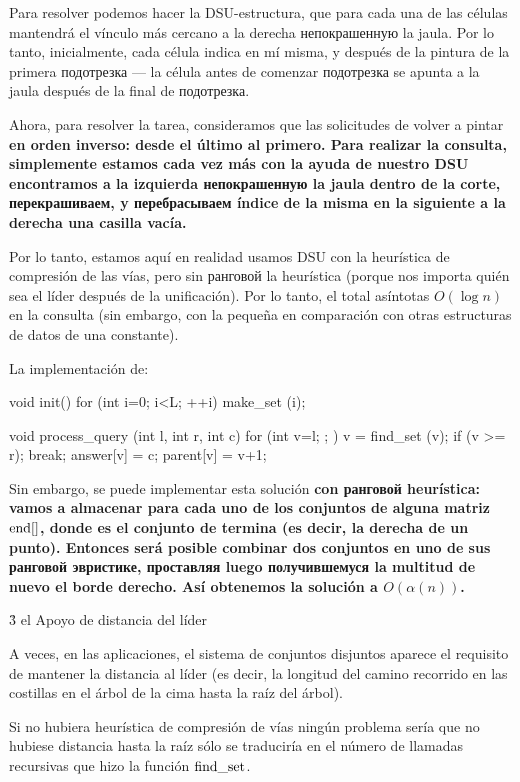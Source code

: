 Para resolver podemos hacer la DSU-estructura, que para cada una de las células mantendrá el vínculo más cercano a la derecha непокрашенную la jaula. Por lo tanto, inicialmente, cada célula indica en mí misma, y después de la pintura de la primera подотрезка --- la célula antes de comenzar подотрезка se apunta a la jaula después de la final de подотрезка.

Ahora, para resolver la tarea, consideramos que las solicitudes de volver a pintar \bf{en orden inverso}: desde el último al primero. Para realizar la consulta, simplemente estamos cada vez más con la ayuda de nuestro DSU encontramos a la izquierda непокрашенную la jaula dentro de la corte, перекрашиваем, y перебрасываем índice de la misma en la siguiente a la derecha una casilla vacía.

Por lo tanto, estamos aquí en realidad usamos DSU con la heurística de compresión de las vías, pero sin ранговой la heurística (porque nos importa quién sea el líder después de la unificación). Por lo tanto, el total asíntotas $O(\log n)$ en la consulta (sin embargo, con la pequeña en comparación con otras estructuras de datos de una constante).

La implementación de:

\code
void init() {
for (int i=0; i<L; ++i)
make_set (i);
}

void process_query (int l, int r, int c) {
for (int v=l; ; ) {
v = find_set (v);
if (v >= r); break;
answer[v] = c;
parent[v] = v+1;
}
}
\endcode

Sin embargo, se puede implementar esta solución \bf{con ранговой heurística}: vamos a almacenar para cada uno de los conjuntos de alguna matriz ${\rm end}[]$, donde es el conjunto de termina (es decir, la derecha de un punto). Entonces será posible combinar dos conjuntos en uno de sus ранговой эвристике, проставляя luego получившемуся la multitud de nuevo el borde derecho. Así obtenemos la solución a $O(\alpha(n))$.



\h3{ el Apoyo de distancia del líder }

A veces, en las aplicaciones, el sistema de conjuntos disjuntos aparece el requisito de mantener la distancia al líder (es decir, la longitud del camino recorrido en las costillas en el árbol de la cima hasta la raíz del árbol).

Si no hubiera heurística de compresión de vías ningún problema sería que no hubiese distancia hasta la raíz sólo se traduciría en el número de llamadas recursivas que hizo la función $\rm find\_set$.

